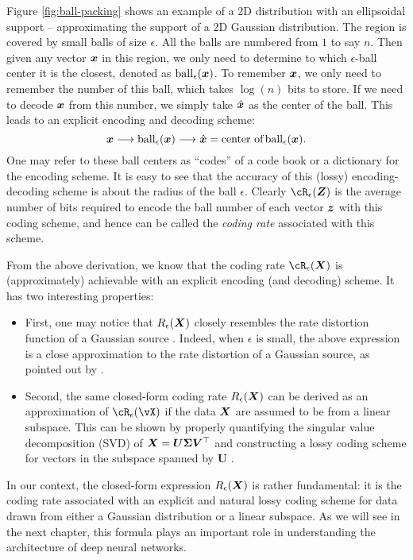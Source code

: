 \documentclass[../../book-main.tex]{subfiles}
\begin{document}
\begin{example}
	Figure \ref{fig:ball-packing} shows an example of a 2D distribution with an ellipsoidal support -- approximating the support of a 2D Gaussian distribution. The region is covered by small balls of size $\epsilon$. All the balls are numbered from $1$ to say $n$. Then given any vector $\bm{x}$ in this region, we
	only need to determine to which $\epsilon$-ball center it is the closest, denoted as $\operatorname{ball}_{\epsilon}(\bm{x})$. To remember $\bm{x}$, we only need to remember the number of this ball, which takes $\log(n)$ bits to store. If we need to decode $\bm{x}$ from this number, we simply take $\hat {\bm{x}}$ as the center of the ball. This leads to an explicit encoding and decoding scheme:
	\begin{equation}
		\bm{x} \longrightarrow \operatorname{ball}_{\epsilon}(\bm{x}) \longrightarrow \hat {\bm{x}} = \mbox{center of} \operatorname{ball}_{\epsilon}(\bm{x}).
	\end{equation}
	One may refer to these ball centers as  ``codes'' of a code book or a dictionary for the encoding scheme. It is easy to see that the accuracy of this (lossy) encoding-decoding scheme is about the radius of the ball $\epsilon$. 
	Clearly $\cR_{\epsilon}(\Z)$ is the average
	number of bits required to encode the ball number of each vector $\bm{z}$ with
	this coding scheme, and hence can be called the {\em coding rate} associated with this scheme.
\end{example}


From the above derivation, we know that the coding rate $\cR_{\epsilon}(\X)$ is (approximately) achievable with an explicit encoding (and decoding) scheme. It has two interesting  properties:
\begin{itemize}
	\item First, one may notice that $R_{\epsilon}(\bm{X})$ closely resembles the rate distortion function of a Gaussian source \cite{Cover-Thomas}. Indeed, when $\epsilon$ is small, the above expression is a close approximation to the rate distortion of a Gaussian source, as pointed out by   \cite{MaY2007-PAMI}.
	\item Second, the same closed-form coding rate $R_{\epsilon}(\bm{X})$ can be derived as an approximation of \(\cR_{\epsilon}(\vX)\) if the data $\bm{X}$ are assumed to be from a linear subspace. This can be shown by properly quantifying the singular value decomposition (SVD) of $\bm{X} = \boldsymbol{U} \boldsymbol{\Sigma}\boldsymbol{V}^\top$ and constructing a lossy coding scheme for vectors in the subspace spanned by $\boldsymbol{U}$ \cite{MaY2007-PAMI}.
\end{itemize}
In our context, the closed-form expression $R_{\epsilon}(\bm{X})$ is rather fundamental: it is the coding rate associated with an explicit and natural lossy coding scheme for data drawn from either a Gaussian distribution or a linear subspace. As we will see in the next chapter, this formula plays an important role in understanding the architecture of deep neural networks.
\end{document}
